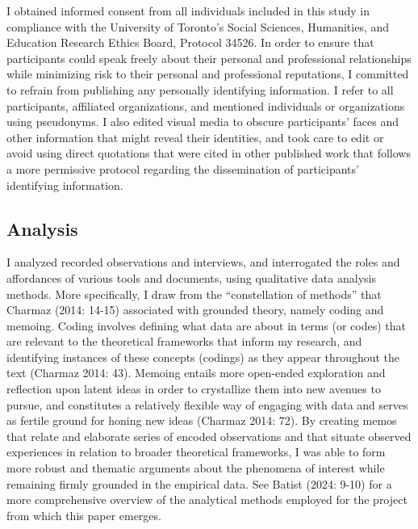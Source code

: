 \documentclass[
]{article}
\begin{document}
I obtained informed consent from all individuals included in this study
in compliance with the University of Toronto's Social Sciences,
Humanities, and Education Research Ethics Board, Protocol 34526. In
order to ensure that participants could speak freely about their
personal and professional relationships while minimizing risk to their
personal and professional reputations, I committed to refrain from
publishing any personally identifying information. I refer to all
participants, affiliated organizations, and mentioned individuals or
organizations using pseudonyms. I also edited visual media to obscure
participants' faces and other information that might reveal their
identities, and took care to edit or avoid using direct quotations that
were cited in other published work that follows a more permissive
protocol regarding the dissemination of participants' identifying
information.

\subsection{Analysis}\label{analysis}

I analyzed recorded observations and interviews, and interrogated the
roles and affordances of various tools and documents, using qualitative
data analysis methods. More specifically, I draw from the
``constellation of methods'' that Charmaz (2014: 14-15) associated with
grounded theory, namely coding and memoing. Coding involves defining
what data are about in terms (or codes) that are relevant to the
theoretical frameworks that inform my research, and identifying
instances of these concepts (codings) as they appear throughout the text
(Charmaz 2014: 43). Memoing entails more open-ended exploration and
reflection upon latent ideas in order to crystallize them into new
avenues to pursue, and constitutes a relatively flexible way of engaging
with data and serves as fertile ground for honing new ideas (Charmaz
2014: 72). By creating memos that relate and elaborate series of encoded
observations and that situate observed experiences in relation to
broader theoretical frameworks, I was able to form more robust and
thematic arguments about the phenomena of interest while remaining
firmly grounded in the empirical data. See Batist (2024: 9-10) for a
more comprehensive overview of the analytical methods employed for the
project from which this paper emerges.
\end{document}
